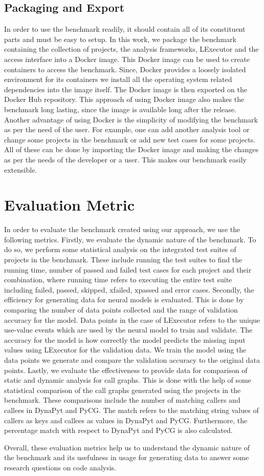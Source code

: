 \subsection{Packaging and Export}
\label{approach:packing and exporting}
In order to use the benchmark readily, it should contain all of its constituent parts and must be easy to setup.
In this work, we package the benchmark containing the collection of projects, the analysis frameworks, LExecutor and the access interface into a Docker \cite{Docker_2022} image.
This Docker image can be used to create containers to access the benchmark.  
Since, Docker provides a loosely isolated environment for its containers we install all the operating system related dependencies into the image itself.
The Docker image is then exported on the Docker Hub \cite{docker_hub} repository.
This approach of using Docker image also makes the benchmark long lasting, since the image is available long after the release.
Another advantage of using Docker is the simplicity of modifying the benchmark as per the need of the user.
For example, one can add another analysis tool or change some projects in the benchmark or add new test cases for some projects.
All of these can be done by importing the Docker image and making the changes as per the needs of the developer or a user.
This makes our benchmark easily extensible.

\section{Evaluation Metric}
In order to evaluate the benchmark created using our approach, we use the following metrics.
Firstly, we evaluate the dynamic nature of the benchmark.
To do so, we perform some statistical analysis on the integrated test suites of projects in the benchmark.
These include running the test suites to find the running time, number of passed and failed test cases for each project and their combination, where running time refers to executing the entire test suite including failed, passed, skipped, xfailed, xpassed and error cases.
Secondly, the efficiency for generating data for neural models is evaluated.
This is done by comparing the number of data points collected and the range of validation accuracy for the model.
Data points in the case of LExecutor refers to the unique use-value events which are used by the neural model to train and validate.
The accuracy for the model is how correctly the model predicts the missing input values using LExecutor for the validation data.
We train the model using the data points we generate and compare the validation accuracy to the original data points.
Lastly, we evaluate the effectiveness to provide data for comparison of static and dynamic analysis for call graphs.
This is done with the help of some statistical comparison of the call graphs generated using the projects in the benchmark.
These comparisons include the number of matching callers and callees in DynaPyt and PyCG.
The match refers to the matching string values of callers as keys and callees as values in DynaPyt and PyCG. 
Furthermore, the percentage match with respect to DynaPyt and PyCG is also calculated.

Overall, these evaluation metrics help us to understand the dynamic nature of the benchmark and its usefulness in usage for generating data to answer some research questions on code analysis.